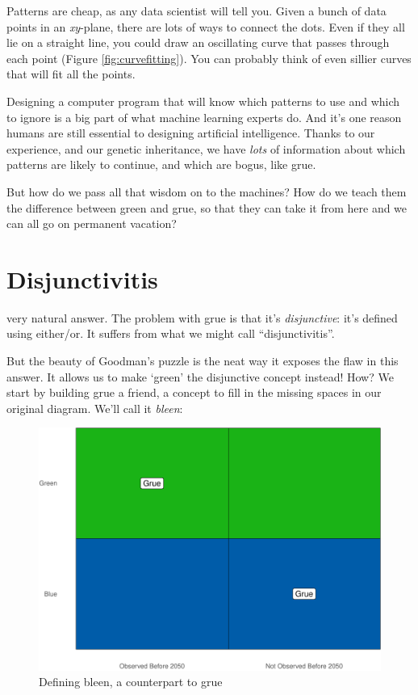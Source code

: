 \documentclass[justified]{tufte-book}
\theoremstyle{definition}
\theoremstyle{definition}
\theoremstyle{definition}
\theoremstyle{remark}
\begin{document}
Patterns are cheap, as any data scientist will tell you. Given a bunch
of data points in an \emph{xy}-plane, there are lots of ways to connect
the dots. Even if they all lie on a straight line, you could draw an
oscillating curve that passes through each point (Figure
\ref{fig:curvefitting}). You can probably think of even sillier curves
that will fit all the points.

Designing a computer program that will know which patterns to use and
which to ignore is a big part of what machine learning experts do. And
it's one reason humans are still essential to designing artificial
intelligence. Thanks to our experience, and our genetic inheritance, we
have \emph{lots} of information about which patterns are likely to
continue, and which are bogus, like grue.

But how do we pass all that wisdom on to the machines? How do we teach
them the difference between green and grue, so that they can take it
from here and we can all go on permanent vacation?

\hypertarget{disjunctivitis}{%
\section*{Disjunctivitis}\label{disjunctivitis}}

 very natural answer. The problem with grue is
that it's \emph{disjunctive}: it's defined using either/or. It suffers
from what we might call ``disjunctivitis''.

But the beauty of Goodman's puzzle is the neat way it exposes the flaw
in this answer. It allows us to make `green' the disjunctive concept
instead! How? We start by building grue a friend, a concept to fill in
the missing spaces in our original diagram. We'll call it \emph{bleen}:

\begin{figure}
\includegraphics{_main_files/figure-latex/unnamed-chunk-170-1} \caption[Defining bleen, a counterpart to grue]{Defining bleen, a counterpart to grue}\label{fig:unnamed-chunk-170}
\end{figure}
\end{document}

